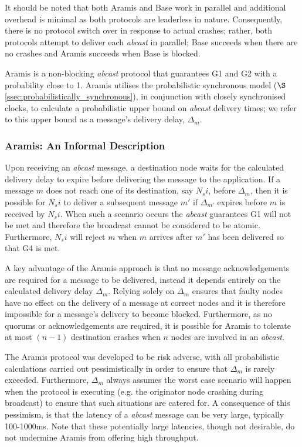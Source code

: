     It should be noted that both \textsf{Aramis} and \textsf{Base} work in parallel and additional overhead is minimal as both protocols are leaderless in nature.  Consequently, there is no protocol switch over in response to actual crashes; rather, both protocols attempt to deliver each \emph{abcast} in parallel; \textsf{Base} succeeds when there are no crashes and \textsf{Aramis} succeeds when \textsf{Base} is blocked.  
    
    \textsf{Aramis} is a non-blocking \emph{abcast} protocol that guarantees G1 and G2 with a probability close to 1.  \textsf{Aramis} utilises the probabilistic synchronous model ($\S$ \ref{ssec:probabilistically_synchronous}), in conjunction with closely synchronised clocks, to calculate a probabilistic upper bound on \emph{abcast} delivery times; we refer to this upper bound as a message's delivery delay, $\Delta_m$.  
    
    \subsubsection*{\textsf{Aramis: } An Informal Description}
    Upon receiving an \emph{abcast} message, a destination node waits for the calculated delivery delay to expire before delivering the message to the application.  If a message $m$ does not reach one of its destination, say $N_si$, before $\Delta_m$, then it is possible for $N_si$ to deliver a subsequent message $m'$ if $\Delta_{m'}$ expires before $m$ is received by $N_si$.  When such a scenario occurs the \emph{abcast} guarantees G1 will not be met and therefore the broadcast cannot be considered to be atomic.  Furthermore, $N_si$ will reject $m$ when $m$ arrives after $m'$ has been delivered so that G4 is met.  
    
    A key advantage of the \textsf{Aramis} approach is that no message acknowledgements are required for a message to be delivered, instead it depends entirely on the calculated delivery delay $\Delta_m$.  Relying solely on $\Delta_m$ ensures that faulty nodes have no effect on the delivery of a message at correct nodes and it is therefore impossible for a message's delivery to become blocked.  Furthermore, as no quorums or acknowledgements are required, it is possible for  \textsf{Aramis} to tolerate at most $(n - 1)$ destination crashes when $n$ nodes are involved in an \emph{abcast}.  
    
    The \textsf{Aramis} protocol was developed to be risk adverse, with all probabilistic calculations carried out pessimistically in order to ensure that $\Delta_m$ is rarely exceeded.  Furthermore, $\Delta_m$ always assumes the worst case scenario will happen when the protocol is executing (e.g. the originator node crashing during broadcast) to ensure that such situations are catered for.  A consequence of this pessimism, is that the latency of a \emph{abcast} message can be very large, typically 100-1000ms.  Note that these potentially large latencies, though not desirable, do not undermine \textsf{Aramis} from offering high throughput.  
    
